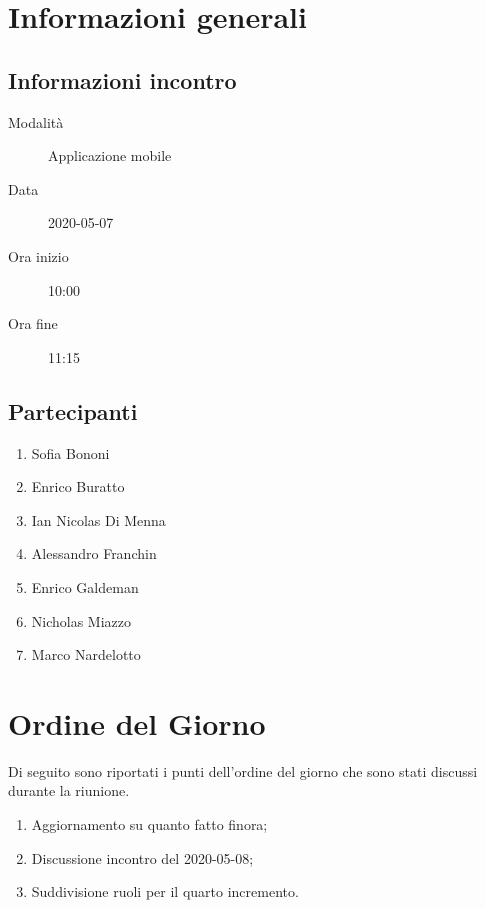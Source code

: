 \documentclass{article}
\begin{document}


\section{Informazioni generali}%
\label{sec:informazioni_generali}

\subsection{Informazioni incontro}%
\label{sub:informazioni_incontro}

\begin{description}
  \item[Modalità] Applicazione mobile 
  \item[Data] 2020-05-07
  \item[Ora inizio] 10:00
  \item[Ora fine] 11:15
\end{description}

\subsection{Partecipanti}%
\label{sub:partecipanti}

\begin{enumerate}
  \item Sofia Bononi
  \item Enrico Buratto
  \item Ian Nicolas Di Menna
  \item Alessandro Franchin
  \item Enrico Galdeman
  \item Nicholas Miazzo
  \item Marco Nardelotto
\end{enumerate}

\section{Ordine del Giorno}%
\label{ordine_del_giorno}
Di seguito sono riportati i punti dell'ordine del giorno che sono stati discussi durante la riunione.
\begin{enumerate}
  \item Aggiornamento su quanto fatto finora;
  \item Discussione incontro del 2020-05-08;
  \item Suddivisione ruoli per il quarto incremento.
\end{enumerate}
\end{document}
